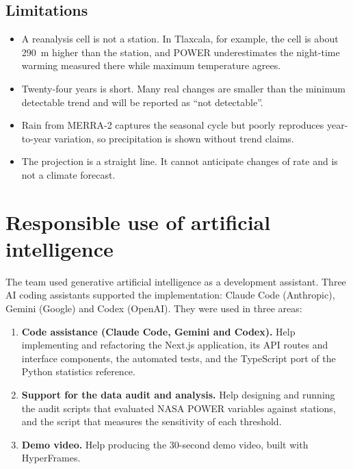 \documentclass[12pt, oneside, openany]{report}
\begin{document}
\section{Limitations}

\begin{itemize}[leftmargin=*]
    \item A reanalysis cell is not a station. In Tlaxcala, for example, the cell is about \SI{290}{\m} higher than the station, and POWER underestimates the night-time warming measured there while maximum temperature agrees.
    \item Twenty-four years is short. Many real changes are smaller than the minimum detectable trend and will be reported as \enquote{not detectable}.
    \item Rain from MERRA-2 captures the seasonal cycle but poorly reproduces year-to-year variation, so precipitation is shown without trend claims.
    \item The projection is a straight line. It cannot anticipate changes of rate and is not a climate forecast.
\end{itemize}

\chapter{Responsible use of artificial intelligence}\label{cap:ai}

The team used generative artificial intelligence as a development assistant. Three AI coding assistants supported the implementation: Claude Code (Anthropic), Gemini (Google) and Codex (OpenAI). They were used in three areas:

\begin{enumerate}[leftmargin=*]
    \item \textbf{Code assistance (Claude Code, Gemini and Codex).} Help implementing and refactoring the Next.js application, its API routes and interface components, the automated tests, and the TypeScript port of the Python statistics reference.
    \item \textbf{Support for the data audit and analysis.} Help designing and running the audit scripts that evaluated NASA POWER variables against stations, and the script that measures the sensitivity of each threshold.
    \item \textbf{Demo video.} Help producing the 30-second demo video, built with HyperFrames.
\end{enumerate}
\end{document}
